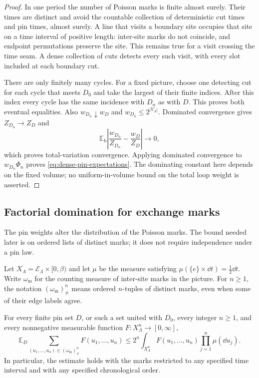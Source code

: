 \begin{proof}
In one period the number of Poisson marks is finite almost surely.
Their times are distinct and avoid the countable collection of
deterministic cut times and pin times, almost surely.  A line that
visits a boundary site occupies that site on a time interval of
positive length: inter-site marks do not coincide, and endpoint
permutations preserve the site.  This remains true for a visit
crossing the time seam.  A dense collection of cuts detects every
such visit, with every slot included at each boundary cut.

There are only finitely many cycles.  For a fixed picture, choose
one detecting cut for each cycle that meets $D_0$ and take the
largest of their finite indices.  After this index every cycle has
the same incidence with $D_n$ as with $D$.  This proves both eventual
equalities.  Also $w_{D_n}\downarrow w_D$ and
$w_{D_n}\le 2^{|V_\Lambda|}$.  Dominated convergence gives
$Z_{D_n}\to Z_D$ and
\[
 \mathbb E_{\mathrm b}
       \left|\frac{w_{D_n}}{Z_{D_n}}-\frac{w_D}{Z_D}\right|
       \longrightarrow0,
\]
which proves total-variation convergence.  Applying dominated
convergence to $w_{D_n}\Phi_n$ proves
\eqref{eq:dense-pin-expectations}.  The dominating constant here
depends on the fixed volume; no uniform-in-volume bound on the
total loop weight is asserted.
\end{proof}

\subsection{Factorial domination for exchange marks}

The pin weights alter the distribution of the Poisson marks.  The
bound needed later is on ordered lists of distinct marks; it does
not require independence under a pin law.

Let
$X_\Lambda=\mathcal E_\Lambda\times[0,\beta)$ and let
$\mu$ be the measure satisfying
$\mu(\{e\}\times\dd t)=\tfrac12\dd t$.
Write $\omega_{\mathrm m}$ for the counting measure of inter-site
marks in the picture.  For $n\ge1$, the notation
$(\omega_{\mathrm m})^n_{\ne}$ means ordered $n$-tuples of distinct
marks, even when some of their edge labels agree.

\begin{lemma}\label{lem:factorial}
For every finite pin set $D$, or such a set united with $D_0$, every
integer $n\ge1$, and every nonnegative measurable function
$F:X_\Lambda^n\to[0,\infty]$,
\begin{equation}\label{eq:factorial-domination}
 \mathbb E_D\sum_{(u_1,\ldots,u_n)\in(\omega_{\mathrm m})^n_{\ne}}
                 F(u_1,\ldots,u_n)
 \le 2^n\int_{X_\Lambda^n}F(u_1,\ldots,u_n)
                          \prod_{j=1}^n\mu(\dd u_j).
\end{equation}
In particular, the estimate holds with the marks restricted to any
specified time interval and with any specified chronological order.
\end{lemma}


